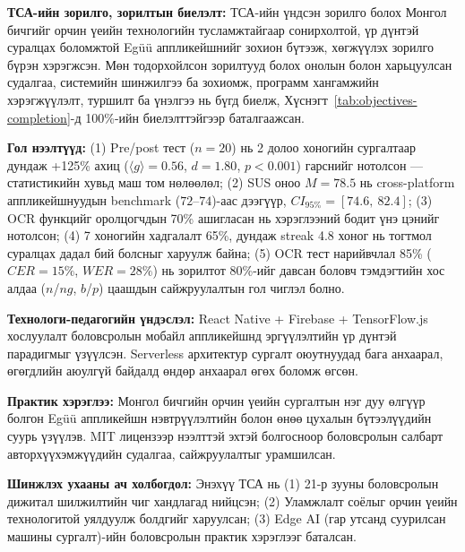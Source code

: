\textbf{ТСА-ийн зорилго, зорилтын биелэлт:} ТСА-ийн үндсэн зорилго болох Монгол бичгийг орчин үеийн технологийн тусламжтайгаар сонирхолтой, үр дүнтэй суралцах боломжтой Egüü аппликейшнийг зохион бүтээж, хөгжүүлэх зорилго бүрэн хэрэгжсэн. Мөн тодорхойлсон зорилтууд болох онолын болон харьцуулсан судалгаа, системийн шинжилгээ ба зохиомж, программ хангамжийн хэрэгжүүлэлт, туршилт ба үнэлгээ нь бүгд биелж, Хүснэгт~\ref{tab:objectives-completion}-д 100\%-ийн биелэлттэйгээр баталгаажсан.

\textbf{Гол нээлтүүд:} (1) Pre/post тест ($n=20$) нь 2 долоо хоногийн сургалтаар дундаж +125\% ахиц ($\langle g \rangle=0.56$, $d=1.80$, $p<0.001$) гарснийг нотолсон — статистикийн хувьд маш том нөлөөлөл; (2) SUS оноо $M=78.5$ нь cross-platform аппликейшнуудын benchmark ($72$--$74$)-аас дээгүүр, $CI_{95\%} = [74.6,\ 82.4]$; (3) OCR функцийг оролцогчдын 70\% ашигласан нь хэрэглээний бодит үнэ цэнийг нотолсон; (4) 7 хоногийн хадгалалт 65\%, дундаж streak 4.8 хоног нь тогтмол суралцах дадал бий болсныг харуулж байна; (5) OCR тест нарийвчлал 85\% ($CER=15\%$, $WER=28\%$) нь зорилтот 80\%-ийг давсан боловч тэмдэгтийн хос алдаа ($n$/$ng$, $b$/$p$) цаашдын сайжруулалтын гол чиглэл болно.

\textbf{Технологи-педагогийн үндэслэл:} React Native + Firebase + TensorFlow.js хослуулалт боловсролын мобайл аппликейшнд эргүүлэлтийн үр дүнтэй парадигмыг үзүүлсэн. Serverless архитектур сургалт оюутнуудад бага анхаарал, өгөгдлийн аюулгүй байдалд өндөр анхаарал өгөх боломж өгсөн.

\textbf{Практик хэрэглээ:} Монгол бичгийн орчин үеийн сургалтын нэг дуу өлгүүр болгон Egüü аппликейшн нэвтрүүлэлтийн болон өнөө цухалын бүтээлүүдийн суурь үзүүлэв. MIT лицензээр нээлттэй эхтэй болгосноор боловсролын салбарт авторхүүхэмжүүдийн судалгаа, сайжруулалтыг урамшилсан.

\textbf{Шинжлэх ухааны ач холбогдол:} Энэхүү ТСА нь (1) 21-р зууны боловсролын дижитал шилжилтийн чиг хандлагад нийцсэн; (2) Уламжлалт соёлыг орчин үеийн технологитой уялдуулж болдгийг харуулсан; (3) Edge AI (гар утсанд суурилсан машины сургалт)-ийн боловсролын практик хэрэглээг баталсан.


\vfill